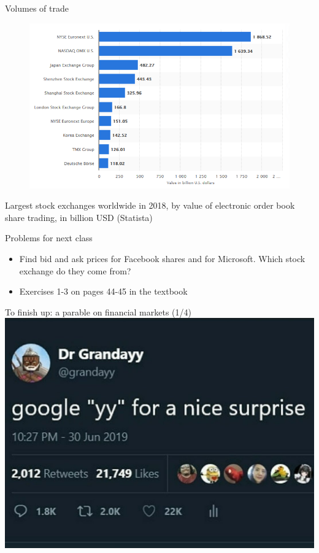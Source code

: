 \begin{frame}{Volumes of trade}
\begin{figure}
	\includegraphics[width=.75\paperwidth]{pics/volumes2018}
\end{figure}
Largest stock exchanges worldwide in 2018, by value of electronic order book share trading, in billion USD (Statista)
\end{frame}


\begin{frame}{Problems for next class}
\begin{itemize}
	\item Find bid and ask prices for Facebook shares and for Microsoft. Which stock exchange do they come from? 
	\item Exercises 1-3 on pages 44-45 in the textbook
\end{itemize}
\end{frame}


\begin{frame}{To finish up: a parable on financial markets (1/4)}
	\centering \includegraphics[width=0.6\paperwidth]{pics/yy1}
\end{frame}


